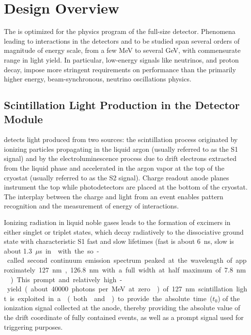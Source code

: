 \section{Design Overview}
\label{sec:dp-pds-overview}

The \dual {} is optimized for the physics program of the full-size \dual {} detector. Phenomena leading to interactions in the  detectors and to be studied span several orders of magnitude of energy scale, from a few \si{MeV} to several \si{GeV}, with commensurate range in light yield. In particular, low-energy signals like  neutrinos, and proton decay, impose more stringent requirements on  performance than the primarily higher energy, beam-synchronous, neutrino oscillations physics.



\subsection{Scintillation Light Production in the \dual Detector Module}
\label{sec:dp-pds-overview_scintillation}

\dual {} detects light produced from two sources: the scintillation process originated by ionizing particles propagating in the liquid argon (usually referred to as the S1 signal) and by the electroluminescence process due to drift electrons extracted from the liquid phase and accelerated in the argon vapor at the top of the cryostat (usually referred to as the S2 signal). Charge readout anode planes instrument the top while photodetectors are placed at the bottom of the cryostat. The interplay between the charge and light from an event enables pattern recognition and the measurement of energy of interactions.

Ionizing radiation in liquid noble gases leads to the formation of excimers in either singlet or triplet states, which decay radiatively to the dissociative ground state with characteristic S1 fast and slow lifetimes (fast is about \SI{6}{ns}, slow is about \SI{1.3}{$\mu$s} in \lar with the so-called second continuum emission spectrum peaked at the wavelength of approximately \SI{127}{nm}, \SI{126.8}{nm} with a full width at half maximum of \SI{7.8}{nm} \cite{Heindl}). This prompt and relatively high-yield (about \num{40000} photons per \si{MeV} at zero \efield) of \SI{127}{nm} scintillation light is exploited in a \lartpc (both  and ) to provide the absolute time ($t_0$) of the ionization signal collected at the anode, thereby providing the absolute value of the drift coordinate of fully contained events, as well as a prompt signal used for triggering purposes.


